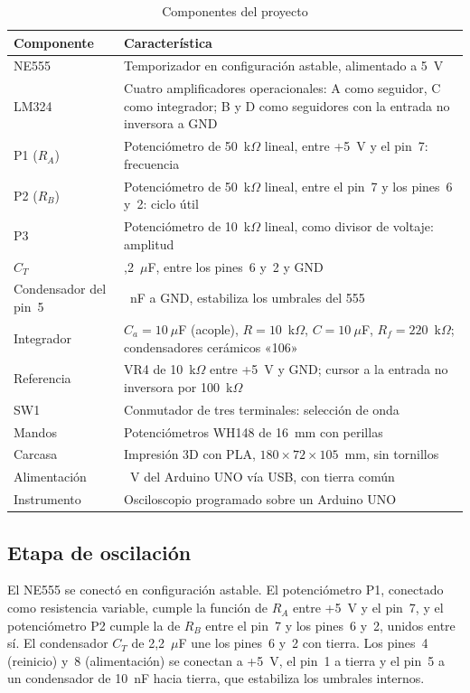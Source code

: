 \documentclass[conference]{IEEEtran}
\begin{document}
\begin{table}[!t]
\caption{Componentes del proyecto}
\label{tab:componentes}
\centering
\begin{tabular}{>{\raggedright\arraybackslash}p{} >{\raggedright\arraybackslash}p{}}
\hline
\textbf{Componente} & \textbf{Característica} \\
\hline
NE555 & Temporizador en configuración astable, alimentado a 5~V \\
LM324 & Cuatro amplificadores operacionales: A como seguidor, C como integrador; B y D como seguidores con la entrada no inversora a GND \\
P1 ($R_A$) & Potenciómetro de 50~k$\Omega$ lineal, entre +5~V y el pin~7: frecuencia \\
P2 ($R_B$) & Potenciómetro de 50~k$\Omega$ lineal, entre el pin~7 y los pines~6 y~2: ciclo útil \\
P3 & Potenciómetro de 10~k$\Omega$ lineal, como divisor de voltaje: amplitud \\
$C_T$ & 2,2~$\mu$F, entre los pines~6 y~2 y GND \\
Condensador del pin~5 & 10~nF a GND, estabiliza los umbrales del 555 \\
Integrador & $C_a = 10~\mu$F (acople), $R = 10$~k$\Omega$, $C = 10~\mu$F, $R_f = 220$~k$\Omega$; condensadores cerámicos «106» \\
Referencia & VR4 de 10~k$\Omega$ entre +5~V y GND; cursor a la entrada no inversora por 100~k$\Omega$ \\
SW1 & Conmutador de tres terminales: selección de onda \\
Mandos & Potenciómetros WH148 de 16~mm con perillas \\
Carcasa & Impresión 3D con PLA, $180 \times 72 \times 105$~mm, sin tornillos \\
Alimentación & 5~V del Arduino UNO vía USB, con tierra común \\
Instrumento & Osciloscopio programado sobre un Arduino UNO \\
\hline
\end{tabular}
\end{table}

\subsection{Etapa de oscilación}

El NE555 se conectó en configuración astable. El potenciómetro P1, conectado como resistencia variable, cumple la función de $R_A$ entre +5~V y el pin~7, y el potenciómetro P2 cumple la de $R_B$ entre el pin~7 y los pines~6 y~2, unidos entre sí. El condensador $C_T$ de 2,2~$\mu$F une los pines~6 y~2 con tierra. Los pines~4 (reinicio) y~8 (alimentación) se conectan a +5~V, el pin~1 a tierra y el pin~5 a un condensador de 10~nF hacia tierra, que estabiliza los umbrales internos.
\end{document}
